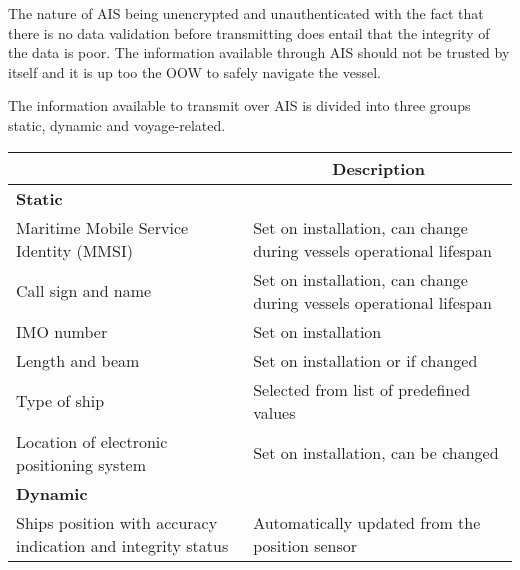 \documentclass[../main.tex]{subfiles}
\begin{document}
The nature of AIS being unencrypted and unauthenticated with the fact that there is no data validation before transmitting does entail that the integrity of the data is poor. The information available through AIS should not be trusted by itself and it is up too the OOW to safely navigate the vessel.

The information available to transmit over AIS is divided into three groups static, dynamic and voyage-related.

\begin{table}[H]
\centering
\begin{tabular}{|m{5cm}|m{9cm}|}
\hline
\rowcolor[HTML]{C0C0C0} 
\multicolumn{1}{|c|}{\cellcolor[HTML]{C0C0C0}\textbf{Data}}  & \multicolumn{1}{c|}{\cellcolor[HTML]{C0C0C0}\textbf{Description}}                 \\ \hline
\rowcolor[HTML]{C0C0C0} 
\textbf{Static}                                              &                                                                                   \\ \hline
Maritime Mobile Service Identity (MMSI)                      & Set on installation, can change during vessels operational lifespan               \\ \hline
Call sign and name                                           & Set on installation, can change during vessels operational lifespan               \\ \hline
IMO number                                                   & Set on installation                                                               \\ \hline
Length and beam                                              & Set on installation or if changed                                                 \\ \hline
Type of ship                                                 & Selected from list of predefined values                                           \\ \hline
Location of electronic positioning system                    & Set on installation, can be changed                                               \\ \hline
\rowcolor[HTML]{C0C0C0} 
\textbf{Dynamic}                                             &                                                                                   \\ \hline
Ships position with accuracy indication and integrity status & Automatically updated from the position sensor                                    \\ \hline

\end{tabular}
\end{table}
\end{document}

